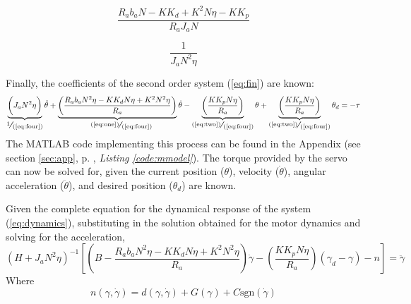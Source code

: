 \begin{minipage}[c]{.5\textwidth}
\begin{equation}
  \frac{R_ab_aN-KK_d+K^2N\eta-KK_p}{R_aJ_aN}
  \label{eq:three}
\end{equation}
\end{minipage}%
\begin{minipage}[c]{.5\textwidth}
\begin{equation}
  \frac{1}{J_aN^2\eta}
  \label{eq:four}
\end{equation}
\end{minipage}

Finally, the coefficients of the second order system (\ref{eq:fin}) are known:
\begin{equation}
  \underbrace{\bigg(J_aN^2\eta\bigg)}_{\scalebox{1.25}{\sfrac{1}{(\ref{eq:four})}}}\ddot{\theta} + \underbrace{\left(\frac{R_ab_aN^2\eta - KK_dN\eta + K^2N^2\eta}{R_a}\right)}_{\quad\scalebox{1.25}{\sfrac{(\ref{eq:one})}{(\ref{eq:four})}}}
  \dot{\theta} - \underbrace{\left(\frac{KK_pN\eta}{R_a}\right)}_{\scalebox{1.25}{\sfrac{(\ref{eq:two})}{(\ref{eq:four})}}}
  \theta + \underbrace{\left(\frac{KK_pN\eta}{R_a}\right)}_{\scalebox{1.25}{\sfrac{(\ref{eq:two})}{(\ref{eq:four})}}}
  \theta_d = -\tau
  \label{eq:fin}
\end{equation}
The MATLAB code implementing this process can be found in the Appendix (see section \ref{sec:app}, p. \pageref{sec:app}, \emph{Listing \ref{code:mmodel}}).
\newpage
The torque provided by the servo can now be solved for, given the current position ($\theta$), velocity ($\dot{\theta}$), angular acceleration ($\ddot{\theta}$), and desired position ($\theta_d$) are known.

Given the complete equation for the dynamical response of the system (\ref{eq:dynamics}), substituting in the solution obtained for the motor dynamics and solving for the acceleration,
\begin{equation}
\left(H + J_aN^2\eta\right)^{-1} \left[\left(B - \frac{R_ab_aN^2\eta - KK_dN\eta + K^2N^2\eta}{R_a}\right)\dot{\gamma} - \left(\frac{KK_pN\eta}{R_a}\right)(\gamma_d - \gamma) - n\right]= \ddot{\gamma}
\end{equation}
Where
\[
n(\gamma,\dot{\gamma}) = d(\gamma,\dot{\gamma}) + G(\gamma) + C\text{sgn}(\dot{\gamma})
\]
\newpage
